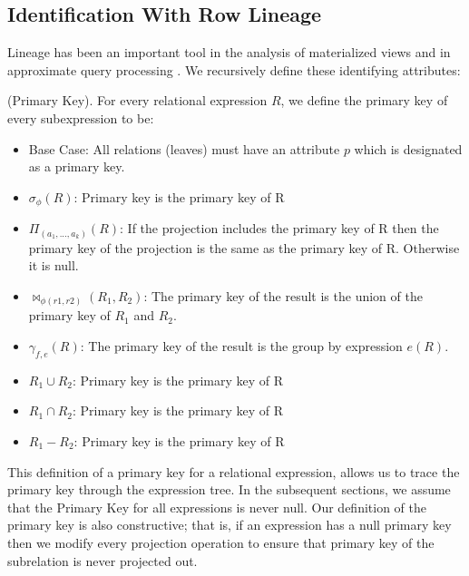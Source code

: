\subsection{Identification With Row Lineage}
Lineage has been an important tool in the analysis of materialized views \cite{DBLP:journals/vldb/CuiW03} and in approximate query processing \cite{DBLP:conf/sigmod/ZengGMZ14}. 
We recursively define these identifying attributes:
\begin{definition}
(Primary Key). For every relational expression $R$, we define the primary key of every subexpression to be:
\begin{itemize}\vspace{-.45em}
\item Base Case: All relations (leaves) must have an attribute $p$ which is designated as a primary key.\vspace{-.45em}
\item $\sigma_{\phi}(R)$: Primary key is the primary key of R \vspace{-.45em}
\item $\Pi_{(a_1,...,a_k)}(R)$: If the projection includes the primary key of R then the primary key of the projection is the same as the primary key of R. Otherwise it is \textsf{null}.  \vspace{-.45em}
\item $\bowtie_{\phi (r1,r2)}(R_1,R_2)$: The primary key of the result is the union of the primary key of $R_1$ and $R_2$. 
\item $\gamma_{f,e}(R)$: The primary key of the result is the group by expression $e(R)$.\vspace{-.45em}
\item $R_1 \cup R_2$: Primary key is the primary key of R
\item $R_1 \cap R_2$: Primary key is the primary key of R
\item $R_1 - R_2$: Primary key is the primary key of R
\end{itemize}
\end{definition}
This definition of a primary key for a relational expression, allows us to trace the primary key through the expression tree.
In the subsequent sections, we assume that the Primary Key for all expressions is never null. 
Our definition of the primary key is also constructive; that is, if an expression has a null primary key then we modify every projection operation to ensure that primary key of the subrelation is never projected out.

